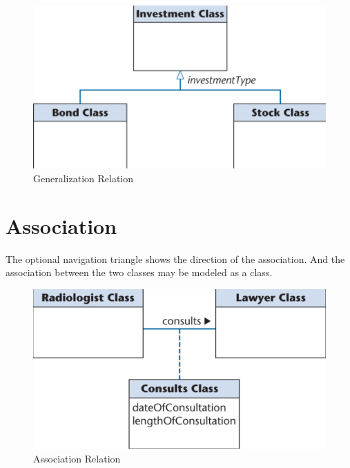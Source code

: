 \documentclass[11pt]{article}
\begin{document}
\begin{figure}[h]
	\centering
	\includegraphics[width=0.5\linewidth]{images/Generalization.png}
	\caption{Generalization Relation}
	\label{fig:Generalization}
\end{figure}

\section*{Association}

The optional navigation triangle shows the direction of the association. And the association between the two classes may be modeled as a class.


\begin{figure}[h]
	\centering
	\includegraphics[width=0.5\linewidth]{images/Association.png}
	\caption{Association Relation}
	\label{fig:Association}
\end{figure}
\end{document}
